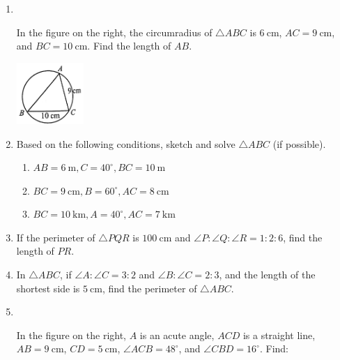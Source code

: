 \documentclass{report}
\begin{document}
\begin{enumerate}
        \item \parbox[t]{0.9\textwidth}{
            ~
            \vspace{-1.1em}
            \begin{vwcol}[widths={0.7,0.3}, sep=8mm, rule=0pt]
                In the figure on the right, the circumradius of $\triangle ABC$ is $6 \mathrm{~cm}$, $AC = 9 \mathrm{~cm}$, and $BC = 10 \mathrm{~cm}$. Find the length of $AB$.
    
                \includegraphics[width=0.2\textwidth]{assets/10-16.jpg}
            \end{vwcol}
        }

        \vspace{-2.5em}
        \item Based on the following conditions, sketch and solve $\triangle ABC$ (if possible).

        \begin{enumerate}
            \item $AB = 6 \mathrm{~m}, C = 40^\circ, BC = 10 \mathrm{~m}$
            
            \item $BC = 9 \mathrm{~cm}, B = 60^\circ, AC = 8 \mathrm{~cm}$
            
            \item $BC = 10 \mathrm{~km}, A = 40^\circ, AC = 7 \mathrm{~km}$
        \end{enumerate}

        \item If the perimeter of $\triangle PQR$ is $100 \mathrm{~cm}$ and $\angle P: \angle Q: \angle R = 1: 2: 6$, find the length of $PR$.

        \item In $\triangle ABC$, if $\angle A: \angle C = 3: 2$ and $\angle B: \angle C = 2: 3$, and the length of the shortest side is $5 \mathrm{~cm}$, find the perimeter of $\triangle ABC$.

        \item \parbox[t]{0.9\textwidth}{
            ~
            \vspace{-1.1em}
            \begin{vwcol}[widths={0.7,0.3}, sep=8mm, rule=0pt]
                In the figure on the right, $A$ is an acute angle, $ACD$ is a straight line, $AB = 9 \mathrm{~cm}$, $CD = 5 \mathrm{~cm}$, $\angle ACB = 48^\circ$, and $\angle CBD = 16^\circ$. Find:


\end{vwcol}}
\end{enumerate}
\end{document}
